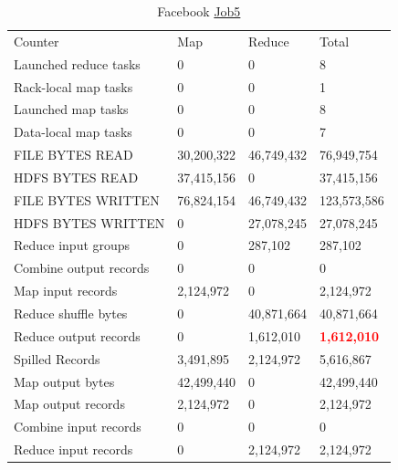 \documentclass[paper=a4, fontsize=11pt]{scrartcl}	%
\numberwithin{equation}{section}															%
\numberwithin{figure}{section}																%
\numberwithin{table}{section}																%
\begin{document}
\begin{table}[!h]
	\centering
	\caption{Facebook \href{http://hadoop-compute0.di.univr.it:50030/jobdetails.jsp?jobid=job_201603141010_12305}{Job5}}
	\label{my-label}
	\begin{tabular}{llll}
		Counter&	Map&	Reduce&	Total\\
		Launched reduce tasks&	0&	0&	8\\
		Rack-local map tasks&	0&	0&	1\\
		Launched map tasks&	0&	0&	8\\
		Data-local map tasks&	0&	0&	7\\
		FILE BYTES READ&	30,200,322&	46,749,432&	76,949,754\\
		HDFS BYTES READ&	37,415,156&	0&	37,415,156\\
		FILE BYTES WRITTEN&	76,824,154&	46,749,432&	123,573,586\\
		HDFS BYTES WRITTEN&	0&	27,078,245&	27,078,245\\
		Reduce input groups&	0&	287,102&	287,102\\
		Combine output records&	0&	0&	0\\
		Map input records&	2,124,972&	0&	2,124,972\\
		Reduce shuffle bytes&	0&	40,871,664&	40,871,664\\
		Reduce output records&	0&	1,612,010&	\textbf{\textcolor{red}{1,612,010}}\\
		Spilled Records&	3,491,895&	2,124,972&	5,616,867\\
		Map output bytes&	42,499,440&	0&	42,499,440\\
		Map output records&	2,124,972&	0&	2,124,972\\
		Combine input records&	0&	0&	0\\
		Reduce input records&	0&	2,124,972&	2,124,972\\
		
	\end{tabular}
\end{table}
\FloatBarrier
\end{document}
